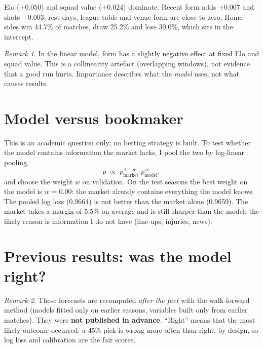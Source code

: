 \documentclass[11pt,a4paper]{article}
\theoremstyle{definition}
\theoremstyle{remark}
\newtheorem{remark}{Remark}[section]
\begin{document}
Elo ($+0.050$) and squad value ($+0.024$) dominate. Recent form adds $+0.007$ and shots $+0.003$; rest days, league table and venue form are close to zero.
Home sides win 44.7\% of matches, draw 25.2\% and lose 30.0\%, which sits in the intercept.

\begin{remark}
In the linear model, form has a slightly negative effect at fixed Elo and squad value. This is a collinearity artefact (overlapping windows), not evidence that a good run hurts.
Importance describes what the \emph{model} uses, not what causes results.
\end{remark}

\section{Model versus bookmaker}

This is an academic question only; no betting strategy is built. To test whether the model contains information the market lacks, I pool the two by log-linear pooling,
\begin{equation}p\;\propto\;p_{\text{market}}^{\,1-w}\;p_{\text{model}}^{\,w},\end{equation}
and choose the weight $w$ on validation. On the test seasons the best weight on the model is $w=0.00$: the market already contains everything the model knows.
The pooled log loss (0.9664) is not better than the market alone (0.9659). The market takes a margin of 5.5\% on average and is still sharper than the model; the likely reason is information I do not have (line-ups, injuries, news).

\section{Previous results: was the model right?}

\begin{remark}
These forecasts are recomputed \emph{after the fact} with the walk-forward method (models fitted only on earlier seasons, variables built only from earlier matches).
They were \textbf{not published in advance}. ``Right'' means that the most likely outcome occurred: a 45\% pick is wrong more often than right, by design, so log loss and calibration are the fair scores.
\end{remark}
\end{document}
